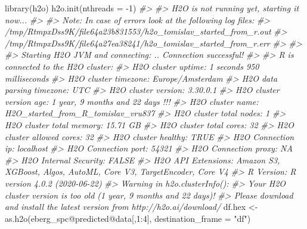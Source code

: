 \documentclass[
  graybox,natbib,nospthms]{svmono}
\newenvironment{Shaded}{\begin{snugshade}}{\end{snugshade}}
\newcommand{\AttributeTok}[1]{\textcolor[rgb]{0.61,0.61,0.61}{#1}}
\newcommand{\CommentTok}[1]{\textcolor[rgb]{0.37,0.37,0.37}{\textit{#1}}}
\newcommand{\DecValTok}[1]{\textcolor[rgb]{0.06,0.06,0.06}{#1}}
\newcommand{\FunctionTok}[1]{\textcolor[rgb]{0,0,0}{#1}}
\newcommand{\NormalTok}[1]{#1}
\newcommand{\OtherTok}[1]{\textcolor[rgb]{0.37,0.37,0.37}{#1}}
\newcommand{\SpecialCharTok}[1]{\textcolor[rgb]{0,0,0}{#1}}
\newcommand{\StringTok}[1]{\textcolor[rgb]{0.5,0.5,0.5}{#1}}
\begin{document}
\begin{Shaded}
\begin{Highlighting}[]
\FunctionTok{library}\NormalTok{(h2o)}
\FunctionTok{h2o.init}\NormalTok{(}\AttributeTok{nthreads =} \SpecialCharTok{{-}}\DecValTok{1}\NormalTok{)}
\CommentTok{\#\textgreater{} }
\CommentTok{\#\textgreater{} H2O is not running yet, starting it now...}
\CommentTok{\#\textgreater{} }
\CommentTok{\#\textgreater{} Note:  In case of errors look at the following log files:}
\CommentTok{\#\textgreater{}     /tmp/RtmpxDss9K/file64a23b831553/h2o\_tomislav\_started\_from\_r.out}
\CommentTok{\#\textgreater{}     /tmp/RtmpxDss9K/file64a27ea38241/h2o\_tomislav\_started\_from\_r.err}
\CommentTok{\#\textgreater{} }
\CommentTok{\#\textgreater{} }
\CommentTok{\#\textgreater{} Starting H2O JVM and connecting: .. Connection successful!}
\CommentTok{\#\textgreater{} }
\CommentTok{\#\textgreater{} R is connected to the H2O cluster: }
\CommentTok{\#\textgreater{}     H2O cluster uptime:         1 seconds 950 milliseconds }
\CommentTok{\#\textgreater{}     H2O cluster timezone:       Europe/Amsterdam }
\CommentTok{\#\textgreater{}     H2O data parsing timezone:  UTC }
\CommentTok{\#\textgreater{}     H2O cluster version:        3.30.0.1 }
\CommentTok{\#\textgreater{}     H2O cluster version age:    1 year, 9 months and 22 days !!! }
\CommentTok{\#\textgreater{}     H2O cluster name:           H2O\_started\_from\_R\_tomislav\_vru837 }
\CommentTok{\#\textgreater{}     H2O cluster total nodes:    1 }
\CommentTok{\#\textgreater{}     H2O cluster total memory:   15.71 GB }
\CommentTok{\#\textgreater{}     H2O cluster total cores:    32 }
\CommentTok{\#\textgreater{}     H2O cluster allowed cores:  32 }
\CommentTok{\#\textgreater{}     H2O cluster healthy:        TRUE }
\CommentTok{\#\textgreater{}     H2O Connection ip:          localhost }
\CommentTok{\#\textgreater{}     H2O Connection port:        54321 }
\CommentTok{\#\textgreater{}     H2O Connection proxy:       NA }
\CommentTok{\#\textgreater{}     H2O Internal Security:      FALSE }
\CommentTok{\#\textgreater{}     H2O API Extensions:         Amazon S3, XGBoost, Algos, AutoML, Core V3, TargetEncoder, Core V4 }
\CommentTok{\#\textgreater{}     R Version:                  R version 4.0.2 (2020{-}06{-}22)}
\CommentTok{\#\textgreater{} Warning in h2o.clusterInfo(): }
\CommentTok{\#\textgreater{} Your H2O cluster version is too old (1 year, 9 months and 22 days)!}
\CommentTok{\#\textgreater{} Please download and install the latest version from http://h2o.ai/download/}
\NormalTok{df.hex }\OtherTok{\textless{}{-}} \FunctionTok{as.h2o}\NormalTok{(eberg\_spc}\SpecialCharTok{@}\NormalTok{predicted}\SpecialCharTok{@}\NormalTok{data[,}\DecValTok{1}\SpecialCharTok{:}\DecValTok{4}\NormalTok{], }\AttributeTok{destination\_frame =} \StringTok{"df"}\NormalTok{)}

\end{Highlighting}
\end{Shaded}
\end{document}
